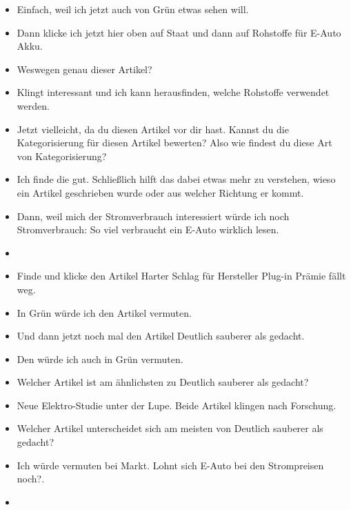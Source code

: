 {\begin{itemize}[]
            \item {} Einfach, weil ich jetzt auch von Grün etwas sehen will.
            \item {} Dann klicke ich jetzt hier oben auf Staat und dann auf \flqq Rohstoffe für E-Auto Akku\frqq{}.
            \item {} Weswegen genau dieser Artikel?
            \item {} Klingt interessant und ich kann herausfinden, welche Rohstoffe verwendet werden.
            \item {} Jetzt vielleicht, da du diesen Artikel vor dir hast.
                  Kannst du die Kategorisierung für diesen Artikel bewerten?
                  Also wie findest du diese Art von Kategorisierung?
            \item {} Ich finde die gut.
                  Schließlich hilft das dabei etwas mehr zu verstehen, wieso ein Artikel geschrieben wurde oder aus welcher Richtung er kommt.
            \item {} Dann, weil mich der Stromverbrauch interessiert würde ich noch \flqq Stromverbrauch: So viel verbraucht ein E-Auto wirklich\frqq{} lesen.
            \item {}
            \item {} Finde und klicke den Artikel \flqq Harter Schlag für Hersteller Plug-in Prämie fällt weg\frqq{}.
            \item {} In Grün würde ich den Artikel vermuten.
            \item {} Und dann jetzt noch mal den Artikel \flqq Deutlich sauberer als gedacht\frqq{}.
            \item {} Den würde ich auch in Grün vermuten.
            \item {} Welcher Artikel ist am ähnlichsten zu \flqq Deutlich sauberer als gedacht\frqq{}?
            \item {} \flqq Neue Elektro-Studie unter der Lupe\frqq{}. Beide Artikel klingen nach Forschung.
            \item {} Welcher Artikel unterscheidet sich am meisten von \flqq Deutlich sauberer als gedacht\frqq{}?
            \item {} Ich würde vermuten bei Markt. \flqq Lohnt sich E-Auto bei den Strompreisen noch?\frqq{}.
            \item {}

\end{itemize}}
